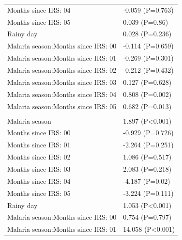 \documentclass[]{article}
\begin{document}
\begin{longtable}[t]{ll}
\hspace{1em}Months since IRS: 04 & -0.059 (P=0.763)\\
\hspace{1em}Months since IRS: 05 & 0.039 (P=0.86)\\
\hspace{1em}Rainy day & 0.028 (P=0.236)\\
\hspace{1em}Malaria season:Months since IRS: 00 & -0.114 (P=0.659)\\
\hspace{1em}Malaria season:Months since IRS: 01 & -0.269 (P=0.301)\\
\hspace{1em}Malaria season:Months since IRS: 02 & -0.212 (P=0.432)\\
\hspace{1em}Malaria season:Months since IRS: 03 & 0.127 (P=0.628)\\
\hspace{1em}Malaria season:Months since IRS: 04 & 0.808 (P=0.002)\\
\hspace{1em}Malaria season:Months since IRS: 05 & 0.682 (P=0.013)\\
\addlinespace[1.5em]
\multicolumn{2}{l}{\textbf{Temporary not field worker}}\\
\hspace{1em}Malaria season & 1.897 (P<0.001)\\
\hspace{1em}Months since IRS: 00 & -0.929 (P=0.726)\\
\hspace{1em}Months since IRS: 01 & -2.264 (P=0.251)\\
\hspace{1em}Months since IRS: 02 & 1.086 (P=0.517)\\
\hspace{1em}Months since IRS: 03 & 2.083 (P=0.218)\\
\hspace{1em}Months since IRS: 04 & -4.187 (P=0.02)\\
\hspace{1em}Months since IRS: 05 & -3.224 (P=0.111)\\
\hspace{1em}Rainy day & 1.053 (P<0.001)\\
\hspace{1em}Malaria season:Months since IRS: 00 & 0.754 (P=0.797)\\
\hspace{1em}Malaria season:Months since IRS: 01 & 14.058 (P<0.001)\\

\end{longtable}
\end{document}
